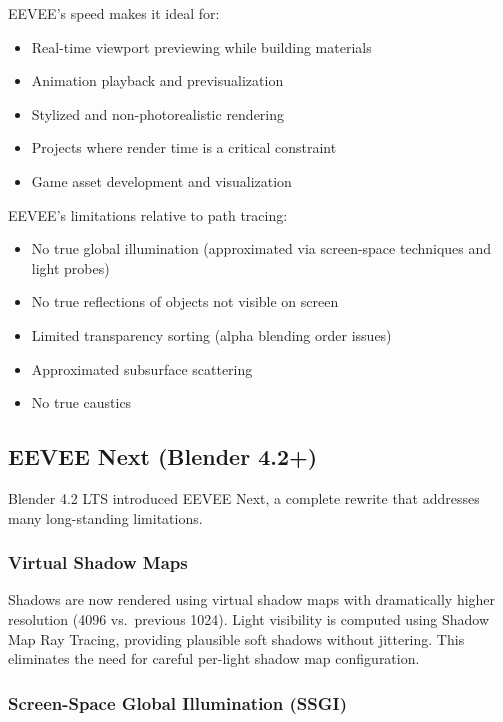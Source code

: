 EEVEE's speed makes it ideal for:
\begin{itemize}[leftmargin=2em]
  \item Real-time viewport previewing while building materials
  \item Animation playback and previsualization
  \item Stylized and non-photorealistic rendering
  \item Projects where render time is a critical constraint
  \item Game asset development and visualization
\end{itemize}

EEVEE's limitations relative to path tracing:
\begin{itemize}[leftmargin=2em]
  \item No true global illumination (approximated via screen-space
        techniques and light probes)
  \item No true reflections of objects not visible on screen
  \item Limited transparency sorting (alpha blending order issues)
  \item Approximated subsurface scattering
  \item No true caustics
\end{itemize}

\subsection{EEVEE Next (Blender 4.2+)}

Blender 4.2 LTS introduced EEVEE Next, a complete rewrite that
addresses many long-standing limitations.

\subsubsection{Virtual Shadow Maps}

Shadows are now rendered using virtual shadow maps with dramatically
higher resolution (4096 vs.\ previous 1024). Light visibility is
computed using Shadow Map Ray Tracing, providing plausible soft
shadows without jittering. This eliminates the need for careful
per-light shadow map configuration.

\subsubsection{Screen-Space Global Illumination (SSGI)}

